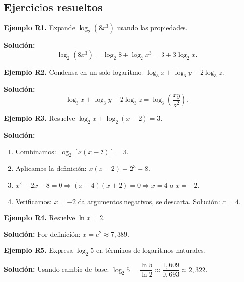 \documentclass[12pt, a4paper]{article}
\begin{document}
  \subsection{Ejercicios resueltos}

  \textbf{Ejemplo R1.} Expande $\log_2(8x^3)$ usando las propiedades.

  \begin{cuadrosolucion}
    \textbf{Solución:}
    $$\log_2(8x^3) = \log_2 8 + \log_2 x^3 = 3 + 3\log_2 x.$$
  \end{cuadrosolucion}

  \textbf{Ejemplo R2.} Condensa en un solo logaritmo: $\log_3 x + \log_3 y - 2\log_3 z$.

  \begin{cuadrosolucion}
    \textbf{Solución:}
    $$\log_3 x + \log_3 y - 2\log_3 z = \log_3\left(\frac{xy}{z^2}\right).$$
  \end{cuadrosolucion}

  \textbf{Ejemplo R3.} Resuelve $\log_2 x + \log_2(x - 2) = 3$.

  \begin{cuadrosolucion}
    \textbf{Solución:}
    \begin{enumerate}
      \item Combinamos: $\log_2[x(x - 2)] = 3$.
      \item Aplicamos la definición: $x(x - 2) = 2^3 = 8$.
      \item $x^2 - 2x - 8 = 0 \Rightarrow (x - 4)(x + 2) = 0 \Rightarrow x = 4$ o $x = -2$.
      \item Verificamos: $x = -2$ da argumentos negativos, se descarta. Solución: $x = 4$.
    \end{enumerate}
  \end{cuadrosolucion}

  \textbf{Ejemplo R4.} Resuelve $\ln x = 2$.

  \begin{cuadrosolucion}
    \textbf{Solución:} Por definición: $x = e^2 \approx 7{,}389$.
  \end{cuadrosolucion}

  \textbf{Ejemplo R5.} Expresa $\log_2 5$ en términos de logaritmos naturales.

  \begin{cuadrosolucion}
    \textbf{Solución:} Usando cambio de base: $\log_2 5 = \dfrac{\ln 5}{\ln 2} \approx \dfrac{1{,}609}{0{,}693} \approx 2{,}322$.
  \end{cuadrosolucion}
\end{document}
